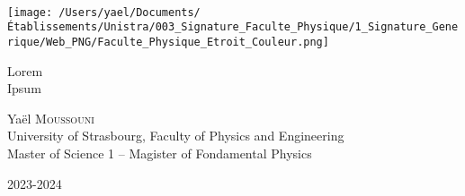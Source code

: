 \documentclass[11pt, a4paper]{article} %
\title{\titre\\\soustitre}
\author{\auteur\\\etab}
\date{\ladate}
\def\titre{Lorem}
\def\soustitre{Ipsum}
\def\auteur{Yaël \textsc{Moussouni}}
\def\etab{University of Strasbourg, Faculty of Physics and Engineering\\ Master of Science 1 -- Magister of Fondamental Physics}
\def\ladate{2023-2024}
\begin{document}
\thispagestyle{empty}
\texttt{[image: /Users/yael/Documents/Établissements/Unistra/003\_Signature\_Faculte\_Physique/1\_Signature\_Generique/Web\_PNG/Faculte\_Physique\_Etroit\_Couleur.png]}
\vspace*{3cm}
\begin{spacing}{1.7}
\begin{center}
{\huge\noindent\titre\\\soustitre}

\vspace*{1cm}
{\large\auteur\\\etab}

\vspace*{1cm}
{\large\ladate}
\end{center}
\end{spacing}

   
   
   

\vfill
\begin{center}
\end{center}
\vfill

\newpage
\tableofcontents
\newpage
\end{document}
